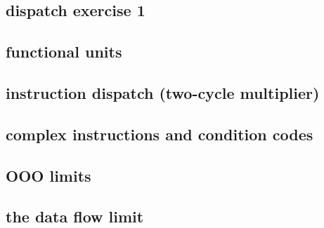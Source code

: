 \subsection{dispatch exercise 1}


\subsection{functional units}


\subsection{instruction dispatch (two-cycle multiplier)}


\subsection{complex instructions and condition codes}


\subsection{OOO limits}


\subsection{the data flow limit}



